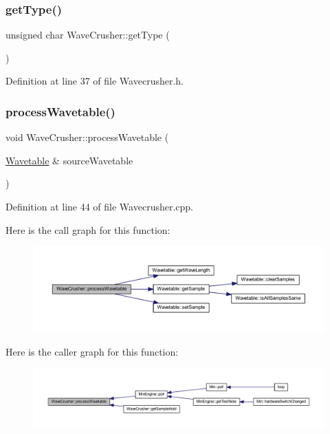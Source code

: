 \subsubsection{\texorpdfstring{get\+Type()}{getType()}}
{\footnotesize\ttfamily unsigned char Wave\+Crusher\+::get\+Type (\begin{DoxyParamCaption}{ }\end{DoxyParamCaption})\hspace{0.3cm}{\ttfamily [inline]}}



Definition at line 37 of file Wavecrusher.\+h.

\mbox{\label{class_wave_crusher_a906f0056db9847e6fafd406ab9e613a9}} 
\subsubsection{\texorpdfstring{process\+Wavetable()}{processWavetable()}}
{\footnotesize\ttfamily void Wave\+Crusher\+::process\+Wavetable (\begin{DoxyParamCaption}\item[{\hyperlink{class_wavetable}{Wavetable} \&}]{source\+Wavetable }\end{DoxyParamCaption})}



Definition at line 44 of file Wavecrusher.\+cpp.

Here is the call graph for this function\+:
\nopagebreak
\begin{figure}[H]
\begin{center}
\leavevmode
\includegraphics[width=350pt]{class_wave_crusher_a906f0056db9847e6fafd406ab9e613a9_cgraph}
\end{center}
\end{figure}
Here is the caller graph for this function\+:
\nopagebreak
\begin{figure}[H]
\begin{center}
\leavevmode
\includegraphics[width=350pt]{class_wave_crusher_a906f0056db9847e6fafd406ab9e613a9_icgraph}
\end{center}
\end{figure}
\mbox{\label{class_wave_crusher_aa3df1e5da9635cf84a59e4d481bf208b}} 

